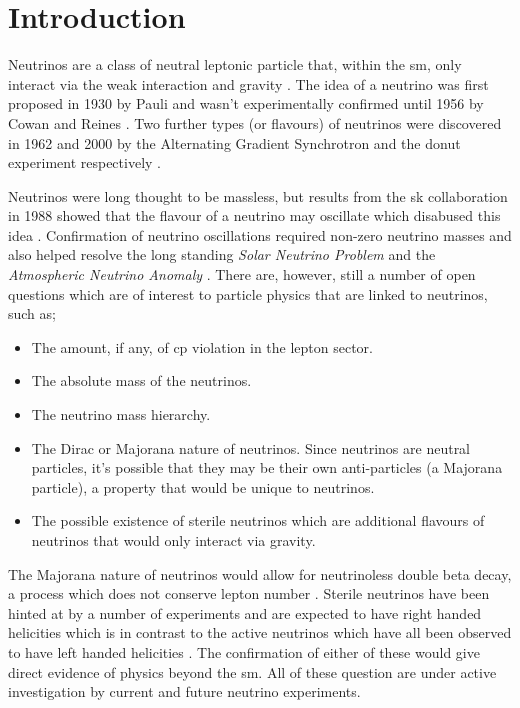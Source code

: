 \chapter{Introduction}
\label{chap:Introduction}


Neutrinos are a class of neutral leptonic particle that, within the \gls{sm}, only interact via the weak interaction and gravity \cite{Particles_and_Fundamental_Interactions:_An_Introduction_to_Particle_Physics}. The idea of a neutrino was first proposed in 1930 by Pauli and wasn't experimentally confirmed until 1956 by Cowan and Reines \cite{Pauli_letter} \cite{cowan_and_reines_paper}. Two further types (or flavours) of neutrinos were discovered in 1962 and 2000 by the Alternating Gradient Synchrotron and the \Gls{donut} experiment respectively \cite{Muon_neutrino_discovery} \cite{DONUT}. 

Neutrinos were long thought to be massless, but results from the \gls{sk} collaboration in 1988 showed that the flavour of a neutrino may oscillate which disabused this idea \cite{SuperK_neutrino_oscillations}. Confirmation of neutrino oscillations required non-zero neutrino masses and also helped resolve the long standing \textit{Solar Neutrino Problem} and the \textit{Atmospheric Neutrino Anomaly} \cite{Homestake} \cite{Atmospheric_anomaly}. There are, however, still a number of open questions which are of interest to particle physics that are linked to neutrinos, such as; 
\begin{itemize}
    \item The amount, if any, of \gls{cp} violation in the lepton sector.
    \item The absolute mass of the neutrinos.
    \item The neutrino mass hierarchy. 
    \item The Dirac or Majorana nature of neutrinos. Since neutrinos are neutral particles, it's possible that they may be their own anti-particles (a Majorana particle), a property that would be unique to neutrinos. 
    \item The possible existence of sterile neutrinos which are additional flavours of neutrinos that would only interact via gravity. 
\end{itemize}
The Majorana nature of neutrinos would allow for neutrinoless double beta decay, a process which does not conserve lepton number \cite{neutrinoless_double_beta_decay}. Sterile neutrinos have been hinted at by a number of experiments and are expected to have right handed helicities which is in contrast to the active neutrinos which have all been observed to have left handed helicities \cite{White_Paper}. The confirmation of either of these would give direct evidence of physics beyond the \gls{sm}. All of these question are under active investigation by current and future neutrino experiments. 

